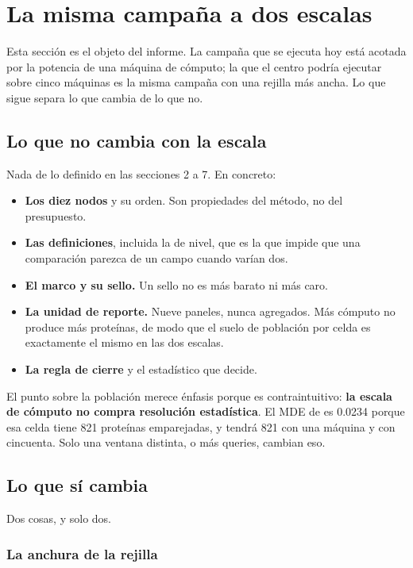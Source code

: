 \section{La misma campaña a dos escalas}
\label{sec:escalas}

Esta sección es el objeto del informe. La campaña que se ejecuta hoy está acotada
por la potencia de una máquina de cómputo; la que el centro podría ejecutar sobre
cinco máquinas es la misma campaña con una rejilla más ancha. Lo que sigue separa
lo que cambia de lo que no.

\subsection{Lo que no cambia con la escala}

Nada de lo definido en las secciones 2 a 7. En concreto:

\begin{itemize}[leftmargin=1.4em,itemsep=0.25em]
  \item \textbf{Los diez nodos} y su orden. Son propiedades del método, no del
        presupuesto.
  \item \textbf{Las definiciones}, incluida la de nivel, que es la que impide que
        una comparación parezca de un campo cuando varían dos.
  \item \textbf{El marco y su sello.} Un sello no es más barato ni más caro.
  \item \textbf{La unidad de reporte.} Nueve paneles, nunca agregados. Más cómputo
        no produce más proteínas, de modo que el suelo de población por celda es
        exactamente el mismo en las dos escalas.
  \item \textbf{La regla de cierre} y el estadístico que decide.
\end{itemize}

El punto sobre la población merece énfasis porque es contraintuitivo:
\textbf{la escala de cómputo no compra resolución estadística}. El MDE de
 es 0.0234 porque esa celda tiene 821 proteínas emparejadas, y tendrá
821 con una máquina y con cincuenta. Solo una ventana distinta, o más queries,
cambian eso.

\subsection{Lo que sí cambia}

Dos cosas, y solo dos.

\subsubsection*{La anchura de la rejilla}

